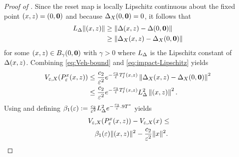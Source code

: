\documentclass[twocolumn]{article}
\begin{document}
\begin{proof} [Proof of ]
  Since the reset map is locally Lipschitz continuous about the fixed point $(x, z) = (0, {\mathbf 0})$ and because $\Delta_{X}(0, {\mathbf 0}) = 0$, it follows that
  \begin{align}
    \label{eq:impact-Lipschitz}
    L_{\Delta} \|(x, z)\| &\geq \| \Delta(x, z) - \Delta(0, {\mathbf 0}) \|\\
    \nonumber
    &\geq \| \Delta_{X}(x, z) - \Delta_{X}(0, {\mathbf 0}) \|
  \end{align}
  for some $(x, z) \in B_{\gamma}(0, {\mathbf 0})$ with $\gamma > 0$ where $L_{\Delta}$ is the Lipschitz constant of $\Delta(x, z)$.
  Combining \eqref{eq:Veh-bound} and \eqref{eq:impact-Lipschitz} yields
  \begin{align}
    \nonumber
    V_{\varepsilon, X}(P_{\varepsilon}^{x}(x, z)) &\leq \frac{c_{2}}{\varepsilon^{2}} e^{-\frac{c_{3}}{\varepsilon} T_{I}^{\varepsilon}(x, z)} \left\| \Delta_{X}(x, z) - \Delta_{X}(0, {\mathbf 0}) \right\|^{2}\\
    &\leq \frac{c_{2}}{\varepsilon^{2}} e^{-\frac{c_{3}}{\varepsilon} T_{I}^{\varepsilon}(x, z)} L_{\Delta}^{2} \left\| (x, z) \right\|^{2}.
  \end{align}
  Using  and defining $\beta_{1}(\varepsilon) := \frac{c_{2}}{\varepsilon^{2}} L_{\Delta}^{2} e^{-\frac{c_{3}}{\varepsilon} .9 T^{*}}$ yields
  \begin{align}
    \label{eq:DVeX-bounds}
    \lefteqn{\Vex(\Pex\argsxz) - \Vex(\zdx) \leq}\\
    \nonumber
    &&\bepsone \nzdxz^{2} - \frac{c_{2}}{\resclfparam^{2}} \nzdx^{2}.
  \end{align}


\end{proof}
\end{document}
